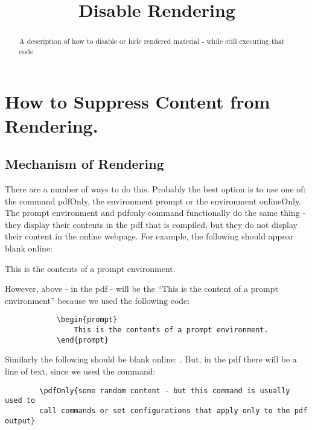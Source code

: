 \documentclass{ximera}
\title{Disable Rendering}
\begin{document}
\begin{abstract}
    A description of how to disable or hide rendered material - while still executing that code.
\end{abstract}
\maketitle
   
\section*{How to Suppress Content from Rendering.}
    \subsection*{Mechanism of Rendering}
        
        There are a number of ways to do this. Probably the best option is to use one of: the command pdfOnly, the environment prompt or the environment onlineOnly. The prompt environment and pdfonly command functionally do the same thing - they display their contents in the pdf that is compiled, but they do not display their content in the online webpage. For example, the following should appear blank online:
        
        \begin{prompt}
            This is the contents of a prompt environment.
        \end{prompt}
        
        However, above - in the pdf - will be the ``This is the content of a prompt environment'' because we used the following code:
        
        \begin{verbatim}
            \begin{prompt}
                This is the contents of a prompt environment.
            \end{prompt}
        \end{verbatim}

        Similarly the following should be blank online: . But, in the pdf there will be a line of text, since we used the command:\\
        
        \begin{verbatim}
        \pdfOnly{some random content - but this command is usually used to 
        call commands or set configurations that apply only to the pdf output}
        \end{verbatim}
        
\end{document}
